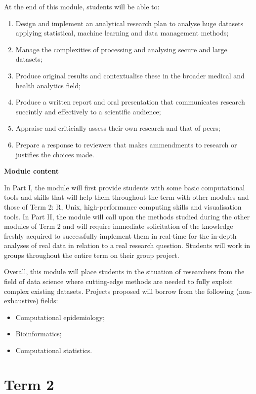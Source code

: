 \documentclass[
]{book}
\providecommand{\tightlist}{%
  \setlength{\itemsep}{0pt}\setlength{\parskip}{0pt}}
\begin{document}
At the end of this module, students will be able to:

\begin{enumerate}
\def\labelenumi{\arabic{enumi}.}
\tightlist
\item
  Design and implement an analytical research plan to analyse huge datasets applying statistical, machine learning and data management methods;
\item
  Manage the complexities of processing and analysing secure and large datasets;
\item
  Produce original results and contextualise these in the broader medical and health analytics field;
\item
  Produce a written report and oral presentation that communicates research succintly and effectively to a scientific audience;
\item
  Appraise and criticially assess their own research and that of peers;
\item
  Prepare a response to reviewers that makes ammendments to research or justifies the choices made.
\end{enumerate}

\textbf{Module content}

In Part I, the module will first provide students with some basic computational tools and skills that will help them throughout the term with other modules and those of Term 2: R, Unix, high-performance computing skills and visualisation tools. In Part II, the module will call upon the methods studied during the other modules of Term 2 and will require immediate solicitation of the knowledge freshly acquired to successfully implement them in real-time for the in-depth analyses of real data in relation to a real research question. Students will work in groups throughout the entire term on their group project.

Overall, this module will place students in the situation of researchers from the field of data science where cutting-edge methods are needed to fully exploit complex existing datasets. Projects proposed will borrow from the following (non-exhaustive) fields:

\begin{itemize}
\tightlist
\item
  Computational epidemiology;
\item
  Bioinformatics;
\item
  Computational statistics.
\end{itemize}

\section*{Term 2}\label{term-2}
\end{document}
